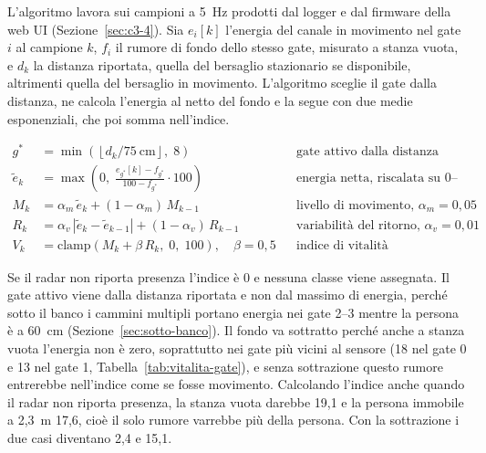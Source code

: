 L'algoritmo lavora sui campioni a 5~Hz prodotti dal logger e dal firmware della web UI (Sezione~\ref{sec:c3-4}). Sia $e_i[k]$ l'energia del canale in movimento nel gate $i$ al campione $k$, $f_i$ il rumore di fondo dello stesso gate, misurato a stanza vuota, e $d_k$ la distanza riportata, quella del bersaglio stazionario se disponibile, altrimenti quella del bersaglio in movimento. L'algoritmo sceglie il gate dalla distanza, ne calcola l'energia al netto del fondo e la segue con due medie esponenziali, che poi somma nell'indice.

\begin{align}
g^{*} &= \min\!\left(\left\lfloor d_k / 75~\text{cm} \right\rfloor,\; 8\right)
  && \text{gate attivo dalla distanza riportata} \label{eq:gate-attivo}\\
\tilde e_k &= \max\!\left(0,\; \frac{e_{g^{*}}[k] - f_{g^{*}}}{100 - f_{g^{*}}} \cdot 100\right)
  && \text{energia netta, riscalata su 0--100} \label{eq:netta}\\
M_k &= \alpha_m\, \tilde e_k + (1-\alpha_m)\, M_{k-1}
  && \text{livello di movimento, } \alpha_m = 0{,}05 \label{eq:livello}\\
R_k &= \alpha_v\, \left|\tilde e_k - \tilde e_{k-1}\right| + (1-\alpha_v)\, R_{k-1}
  && \text{variabilità del ritorno, } \alpha_v = 0{,}01 \label{eq:variabilita}\\
V_k &= \mathrm{clamp}\!\left(M_k + \beta\, R_k,\; 0,\; 100\right), \quad \beta = 0{,}5
  && \text{indice di vitalità} \label{eq:vitalita}
\end{align}

Se il radar non riporta presenza l'indice è 0 e nessuna classe viene assegnata. Il gate attivo viene dalla distanza riportata e non dal massimo di energia, perché sotto il banco i cammini multipli portano energia nei gate 2--3 mentre la persona è a 60~cm (Sezione~\ref{sec:sotto-banco}). Il fondo va sottratto perché anche a stanza vuota l'energia non è zero, soprattutto nei gate più vicini al sensore (18 nel gate 0 e 13 nel gate 1, Tabella~\ref{tab:vitalita-gate}), e senza sottrazione questo rumore entrerebbe nell'indice come se fosse movimento. Calcolando l'indice anche quando il radar non riporta presenza, la stanza vuota darebbe 19,1 e la persona immobile a 2,3~m 17,6, cioè il solo rumore varrebbe più della persona. Con la sottrazione i due casi diventano 2,4 e 15,1.

